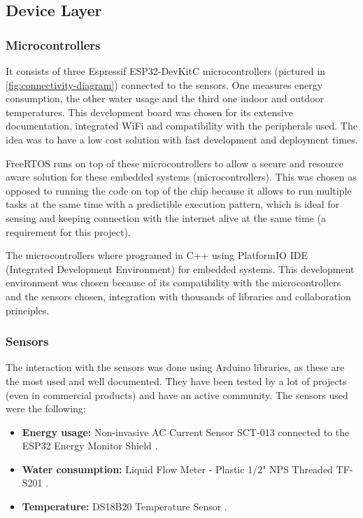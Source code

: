 \subsection{Device Layer}

\subsubsection{Microcontrollers}

It consists of three Espressif ESP32-DevKitC \cite{Espressif2024} microcontrollers (pictured in 
\ref{fig:connectivity-diagram}) connected to the sensors. One measures energy consumption, the other water usage and 
the third one indoor and outdoor temperatures. This development board was chosen for its extensive documentation, 
integrated WiFi and compatibility with the peripherals used. The idea was to have a low cost solution with fast 
development and deployment times.

FreeRTOS \cite{FreeRTOS2024} runs on top of these microcontrollers to allow a secure and resource aware solution for 
these embedded systems (microcontrollers). This was chosen as opposed to running the code on top of the chip because it 
allows to run multiple tasks at the same time with a predictible execution pattern, which is ideal for sensing and 
keeping connection with the internet alive at the same time (a requirement for this project).

The microcontrollers where programed in C++ using PlatformIO IDE (Integrated Development Environment) 
\cite{PlatformIO2024} for embedded systems. This development environment was chosen because of its compatibility with 
the microcontrollers and the sensors chosen, integration with thousands of libraries and collaboration principles.

\subsubsection{Sensors}

The interaction with the sensors was done using Arduino \cite{Arduino2024a} libraries, as these are the most used and 
well documented. They have been tested by a lot of projects (even in commercial products) and have an active community. 
The sensors used were the following:

\begin{itemize}
    \item \textbf{Energy usage:} Non-invasive AC Current Sensor SCT-013 \cite{CRCibernetica2024b} connected to 
    the ESP32 Energy Monitor Shield \cite{CRCibernetica2024c}.
    \item \textbf{Water consumption:} Liquid Flow Meter - Plastic 1/2" NPS Threaded TF-S201 \cite{CRCibernetica2024d}.
    \item \textbf{Temperature:} DS18B20 Temperature Sensor \cite{CRCibernetica2024e}.
\end{itemize}

